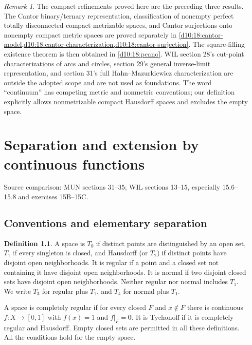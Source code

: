 \documentclass[11pt,oneside,openany]{book}
\theoremstyle{definition}
\newtheorem{definition}[theorem]{Definition}
\theoremstyle{remark}
\newtheorem{remark}[theorem]{Remark}
\newcounter{foundation}
\newcommand{\source}[1]{\par\begingroup\small\sffamily\color{black!65}Source comparison: #1\par\endgroup}
\begin{document}
\begin{remark}\label{d10:06:continuum-scope}
The compact refinements proved here are the preceding three results. The Cantor binary/ternary representation, classification of nonempty perfect totally disconnected compact metrizable spaces, and Cantor surjections onto nonempty compact metric spaces are proved separately in \cref{d10:18:cantor-model,d10:18:cantor-characterization,d10:18:cantor-surjection}. The square-filling existence theorem is then obtained in \cref{d10:18:peano}. WIL section 28's cut-point characterizations of arcs and circles, section 29's general inverse-limit representation, and section 31's full Hahn--Mazurkiewicz characterization are outside the adopted scope and are not used as foundations. The word ``continuum'' has competing metric and nonmetric conventions; our definition explicitly allows nonmetrizable compact Hausdorff spaces and excludes the empty space.
\end{remark}



\chapter{Separation and extension by continuous functions}\label{ch:d10-07}
\source{MUN sections 31--35; WIL sections 13--15, especially 15.6--15.8 and exercises 15B--15C.}

\section{Conventions and elementary separation}
\begin{definition}\label{d10:07:axioms}
A space is $T_0$ if distinct points are distinguished by an open set, $T_1$ if every singleton is closed, and Hausdorff (or $T_2$) if distinct points have disjoint open neighborhoods. It is regular if a point and a closed set not containing it have disjoint open neighborhoods. It is normal if two disjoint closed sets have disjoint open neighborhoods. Neither regular nor normal includes $T_1$. We write $T_3$ for regular plus $T_1$, and $T_4$ for normal plus $T_1$.

A space is completely regular if for every closed $F$ and $x\notin F$ there is continuous $f:X\to[0,1]$ with $f(x)=1$ and $f|_F=0$. It is Tychonoff if it is completely regular and Hausdorff. Empty closed sets are permitted in all these definitions. All the conditions hold for the empty space.
\end{definition}
\end{document}
